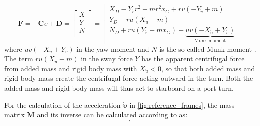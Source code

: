 \begin{equation}
    \label{eq:F_expanded}
\mathbf{F} = - \mathbf{C} \upsilon + \mathbf{D} =
\left[\begin{matrix}
X \\
Y \\
N \\
\end{matrix}\right]
=
\left[\begin{matrix}X_{D} - Y_{\dot{r}} r^{2} + m r^{2} x_{G} + r v \left(- Y_{\dot{v}} + m\right)\\Y_{D} + r u \left(X_{\dot{u}} - m\right)\\N_{D} + r u \left(Y_{\dot{r}} - m x_{G}\right) + \underbrace{u v \left(- X_{\dot{u}} + Y_{\dot{v}}\right)}_{\text{Munk moment}} \end{matrix}\right]
\end{equation}
where $u v \left(- X_{\dot{u}} + Y_{\dot{v}}\right)$ in the yaw moment and $N$ is the so called Munk moment \citep{fossenHandbookMarineCraft2011}. The term $r u \left(X_{\dot{u}} - m\right)$ in the sway force $Y$ has the apparent centrifugal force from added mass and rigid body mass with $X_{\dot{u}}<0$, so that both added mass and rigid body mass create the centrifugal force acting outward in the turn. Both the added mass and rigid body mass will thus act to starboard on a port turn.

For the calculation of the acceleration $\pmb{\bm{\dot{\upsilon}}}$ in \autoref{fig:reference_frames}, the mass matrix $\mathbf{M}$ and its inverse can be calculated according to \citet{fossenHandbookMarineCraft2011} as: 
\begin{equation}
    \label{eq:M_expanded}
    ,
\end{equation}
%     
%     

